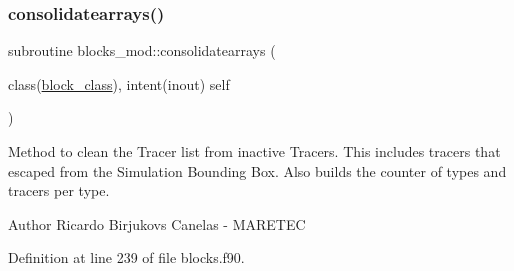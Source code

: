 \subsubsection{\texorpdfstring{consolidatearrays()}{consolidatearrays()}}
{\footnotesize\ttfamily subroutine blocks\+\_\+mod\+::consolidatearrays (\begin{DoxyParamCaption}\item[{class(\mbox{\hyperlink{structblocks__mod_1_1block__class}{block\+\_\+class}}), intent(inout)}]{self }\end{DoxyParamCaption})\hspace{0.3cm}{\ttfamily [private]}}



Method to clean the Tracer list from inactive Tracers. This includes tracers that escaped from the Simulation Bounding Box. Also builds the counter of types and tracers per type. 

\begin{DoxyAuthor}{Author}
Ricardo Birjukovs Canelas -\/ M\+A\+R\+E\+T\+EC 
\end{DoxyAuthor}


Definition at line 239 of file blocks.\+f90.


